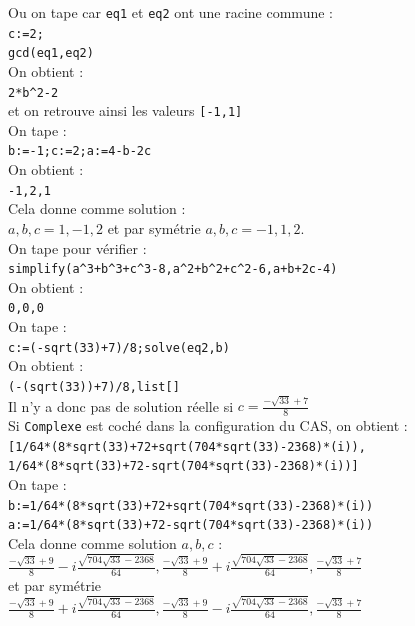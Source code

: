 \documentclass[a4paper,11pt]{book}
\begin{document}
Ou on tape car {\tt eq1} et {\tt eq2} ont une racine commune :\\
{\tt c:=2;}\\
{\tt gcd(eq1,eq2)}\\
On obtient :\\
{\tt 2*b\verb|^|2-2}\\
et on retrouve ainsi les valeurs {\tt [-1,1]}\\
On tape :\\
{\tt b:=-1;c:=2;a:=4-b-2c}\\
On obtient :\\
{\tt -1,2,1}\\
Cela donne comme solution :\\
$a,b,c=1,-1,2$ et par sym\'etrie $a,b,c=-1,1,2$.\\
On tape  pour v\'erifier :\\
{\tt simplify(a\verb|^|3+b\verb|^|3+c\verb|^|3-8,a\verb|^|2+b\verb|^|2+c\verb|^|2-6,a+b+2c-4)}\\
On obtient :\\
{\tt 0,0,0}\\
On tape :\\
{\tt c:=(-sqrt(33)+7)/8;solve(eq2,b)}\\
On obtient :\\
{\tt (-(sqrt(33))+7)/8,list[]}\\
Il n'y a donc pas de solution r\'eelle si $c=\frac{-\sqrt{33}+7}{8}$\\
Si {\tt Complexe} est coch\'e dans la configuration du CAS, on obtient :\\
{\tt [1/64*(8*sqrt(33)+72+sqrt(704*sqrt(33)-2368)*(i)),\\
1/64*(8*sqrt(33)+72-sqrt(704*sqrt(33)-2368)*(i))]}\\  
On tape :\\
{\tt b:=1/64*(8*sqrt(33)+72+sqrt(704*sqrt(33)-2368)*(i))}\\
{\tt a:=1/64*(8*sqrt(33)+72-sqrt(704*sqrt(33)-2368)*(i))}\\
Cela donne comme solution $a,b,c$ :\\
$\displaystyle \frac{-\sqrt{33}+9}{8}-i\frac{\sqrt{704\sqrt{33}-2368}}{64},\frac{-\sqrt{33}+9}{8}+i\frac{\sqrt{704\sqrt{33}-2368}}{64},\frac{-\sqrt{33}+7}{8}$\\
 et par sym\'etrie\\
$\displaystyle \frac{-\sqrt{33}+9}{8}+i\frac{\sqrt{704\sqrt{33}-2368}}{64},\frac{-\sqrt{33}+9}{8}-i\frac{\sqrt{704\sqrt{33}-2368}}{64},\frac{-\sqrt{33}+7}{8}$\\
\end{document}
